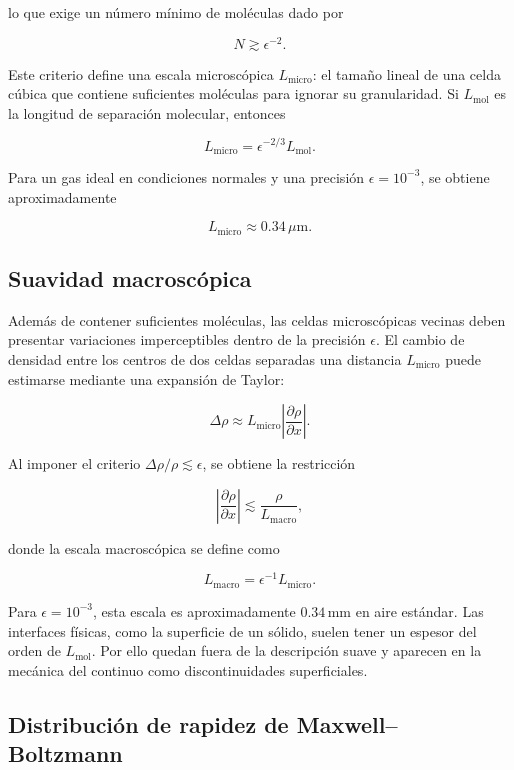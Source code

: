 lo que exige un número mínimo de moléculas dado por

$$
N\gtrsim\epsilon^{-2}.
$$

Este criterio define una escala microscópica $L_{\mathrm{micro}}$: el tamaño
lineal de una celda cúbica que contiene suficientes moléculas para ignorar su
granularidad. Si $L_{\mathrm{mol}}$ es la longitud de separación molecular,
entonces

$$
L_{\mathrm{micro}}
=\epsilon^{-2/3}L_{\mathrm{mol}}.
$$

Para un gas ideal en condiciones normales y una precisión
$\epsilon=10^{-3}$, se obtiene aproximadamente

$$
L_{\mathrm{micro}}\approx0.34\,\mu\mathrm{m}.
$$

\subsection{Suavidad macroscópica}

Además de contener suficientes moléculas, las celdas microscópicas vecinas
deben presentar variaciones imperceptibles dentro de la precisión $\epsilon$.
El cambio de densidad entre los centros de dos celdas separadas una distancia
$L_{\mathrm{micro}}$ puede estimarse mediante una expansión de Taylor:

$$
\Delta\rho
\approx L_{\mathrm{micro}}
\left|\frac{\partial\rho}{\partial x}\right|.
$$

Al imponer el criterio $\Delta\rho/\rho\lesssim\epsilon$, se obtiene la
restricción

$$
\left|\frac{\partial\rho}{\partial x}\right|
\lesssim\frac{\rho}{L_{\mathrm{macro}}},
$$

donde la escala macroscópica se define como

$$
L_{\mathrm{macro}}
=\epsilon^{-1}L_{\mathrm{micro}}.
$$

\figuraSuavidadMacroscopica

Para $\epsilon=10^{-3}$, esta escala es aproximadamente
$0.34\,\mathrm{mm}$ en aire estándar. Las interfaces físicas, como la
superficie de un sólido, suelen tener un espesor del orden de
$L_{\mathrm{mol}}$. Por ello quedan fuera de la descripción suave y aparecen
en la mecánica del continuo como discontinuidades superficiales.


\subsection{Distribución de rapidez de Maxwell--Boltzmann}

